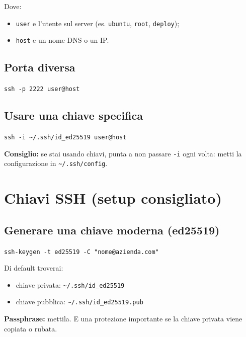 \documentclass[a4paper,11pt]{article}
\begin{document}
Dove:
\begin{itemize}[leftmargin=1.2cm]
    \item \texttt{user} e l'utente sul server (es. \texttt{ubuntu}, \texttt{root}, \texttt{deploy});
    \item \texttt{host} e un nome DNS o un IP.
\end{itemize}

\subsection{Porta diversa}
\begin{codebox}
\texttt{ssh -p 2222 user@host}
\end{codebox}

\subsection{Usare una chiave specifica}
\begin{codebox}
\texttt{ssh -i \textasciitilde/.ssh/id\_ed25519 user@host}
\end{codebox}

\begin{tipbox}
\textbf{Consiglio:} se stai usando chiavi, punta a non passare \texttt{-i} ogni volta: metti la configurazione in \texttt{\textasciitilde/.ssh/config}.
\end{tipbox}

\section{Chiavi SSH (setup consigliato)}
\subsection{Generare una chiave moderna (ed25519)}
\begin{codebox}
\texttt{ssh-keygen -t ed25519 -C "nome@azienda.com"}
\end{codebox}

Di default troverai:
\begin{itemize}[leftmargin=1.2cm]
    \item chiave privata: \texttt{\textasciitilde/.ssh/id\_ed25519}
    \item chiave pubblica: \texttt{\textasciitilde/.ssh/id\_ed25519.pub}
\end{itemize}

\begin{infobox}
\textbf{Passphrase:} mettila. E una protezione importante se la chiave privata viene copiata o rubata.
\end{infobox}
\end{document}

